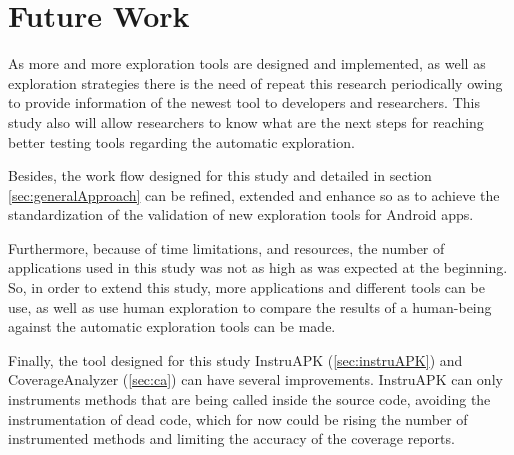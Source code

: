 
\chapter{Future Work} %

\label{Chapter6} %

As more and more exploration tools are designed and implemented, as well as exploration strategies there is the need of repeat this research periodically owing to provide information of the newest tool to developers and researchers. This study also will allow researchers to know what are the next steps for reaching better testing tools regarding the automatic exploration. 

Besides, the work flow designed for this study and detailed in section \ref{sec:generalApproach} can be refined, extended and enhance so as to achieve the standardization of the validation of new exploration tools for Android apps. 

Furthermore, because of time limitations, and resources, the number of applications used in this study was not as high as was expected at the beginning. So, in order to extend this study, more applications and different tools can be use, as well as use human exploration to compare the results of a human-being against the automatic exploration tools can be made.

Finally, the tool designed for this study InstruAPK (\ref{sec:instruAPK}) and CoverageAnalyzer (\ref{sec:ca}) can have several improvements. InstruAPK can only instruments methods that are being called inside the source code, avoiding the instrumentation of dead code, which for now could be rising the number of instrumented methods and limiting the accuracy of the coverage reports.